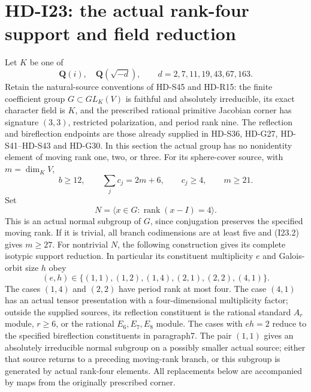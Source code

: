 \section{HD-I23: the actual rank-four support and field reduction}
\label{sec:rank-four-support-field}

Let \(K\) be one of
\[
 \mathbf Q(i),\quad \mathbf Q(\sqrt{-d}),\qquad
                         d=2,7,11,19,43,67,163.             \tag{I23.1}
\]
Retain the natural-source conventions of HD-S45 and HD-R15: the
finite coefficient group \(G\subset GL_K(V)\) is faithful and
absolutely irreducible, its exact character field is \(K\), and
the prescribed rational primitive Jacobian corner has signature
\((3,3)\), restricted polarization, and period rank nine.
The reflection and bireflection endpoints are those already
supplied in HD-S36, HD-G27, HD-S41--HD-S43 and HD-G30. In this section the actual
group has no nonidentity element of moving rank one, two, or three.
For its sphere-cover source, with \(m=\dim_KV\),
\[
       b\ge12,\qquad \sum_jc_j=2m+6,\qquad c_j\ge4,
                               \qquad m\ge21.              \tag{I23.2}
\]
Set
\[
       N=\langle x\in G:\operatorname{rank}(x-I)=4\rangle.
                                                               \tag{I23.3}
\]
This is an actual normal subgroup of \(G\), since conjugation preserves
the specified moving rank. If it is
trivial, all branch codimensions are at least five and (I23.2)
gives \(m\ge27\). For nontrivial \(N\), the following construction
gives its complete isotypic support reduction. In particular its
constituent multiplicity \(e\) and Galois-orbit size \(h\) obey
\[
 (e,h)\in\{(1,1),(1,2),(1,4),(2,1),(2,2),(4,1)\}.         \tag{I23.4}
\]
The cases \((1,4)\) and \((2,2)\) have period rank at most four.
The case \((4,1)\) has an actual tensor presentation with a
four-dimensional multiplicity factor; outside the supplied sources,
its reflection constituent is the rational standard \(A_r\)
module, \(r\ge6\), or the rational \(E_6,E_7,E_8\) module.
The cases with \(eh=2\) reduce to the specified bireflection
constituents in paragraph7. The pair \((1,1)\) gives an absolutely
irreducible normal subgroup on a possibly smaller actual source;
either that source returns to a preceding moving-rank branch,
or this subgroup is generated by actual rank-four elements.
All replacements below
are accompanied by maps from the originally prescribed corner.

